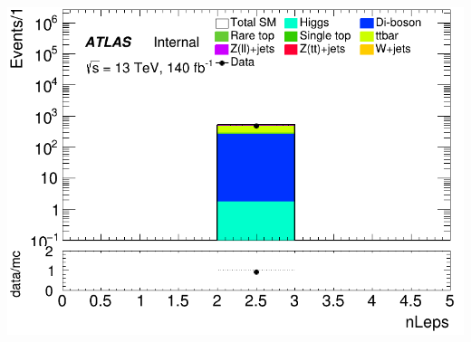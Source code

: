 \documentclass[usenames,dvipsnames]{beamer}
\begin{document}
\begin{frame}
\begin{minipage}{0.32\textwidth}
        \includegraphics[width=\textwidth]{graphics/LLH_met/LLH_met_nLeps.png}
    \end{minipage}
    
    \vspace{0.5cm} %


\end{frame}
\end{document}
